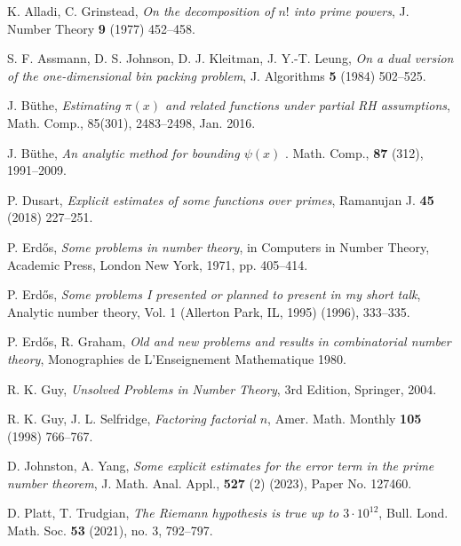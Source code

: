 \documentclass[12pt,a4paper,reqno]{amsart}
\numberwithin{equation}{section}
\theoremstyle{plain}
\theoremstyle{definition}
\begin{document}
\begin{thebibliography}{10}

  
K. Alladi, C. Grinstead, \emph{On the decomposition of $n!$ into prime powers}, J. Number Theory \textbf{9} (1977) 452--458.

S. F. Assmann, D. S. Johnson, D. J. Kleitman, J. Y.-T. Leung, \emph{On a dual version of the one-dimensional bin packing problem}, J. Algorithms \textbf{5} (1984) 502--525.

J. B\"uthe, \emph{Estimating $\pi(x)$ and related functions under partial RH assumptions}, Math. Comp., 85(301), 2483--2498, Jan. 2016.

J. B\"uthe, \emph{An analytic method for bounding $\psi(x)$
}. Math. Comp., \textbf{87} (312), 1991--2009.




P. Dusart, \emph{Explicit estimates of some functions over primes}, Ramanujan J. \textbf{45} (2018) 227--251.

P. Erd\H{o}s, \emph{Some problems in number theory}, in Computers in Number Theory, Academic Press, London New York, 1971, pp. 405--414.

P. Erd\H{o}s, \emph{Some problems I presented or planned to present in my short talk}, Analytic number theory, Vol. 1 (Allerton Park, IL, 1995) (1996), 333--335.

P. Erd\H{o}s, R. Graham, \emph{Old and new problems and results in combinatorial number theory}, Monographies de L'Enseignement Mathematique 1980.

R. K. Guy, \emph{Unsolved Problems in Number Theory}, 3rd Edition, Springer, 2004.

R. K. Guy, J. L. Selfridge, \emph{Factoring factorial $n$}, Amer. Math. Monthly \textbf{105} (1998) 766--767.

D. Johnston, A. Yang, \emph{Some explicit estimates for the error term in the prime number theorem}, J. Math. Anal. Appl., \textbf{527} (2) (2023), Paper No. 127460.

D. Platt, T. Trudgian, \emph{The Riemann hypothesis is true up to $3\cdot10^{12}$}, Bull. Lond. Math. Soc. \textbf{53} (2021), no. 3, 792--797.


\end{thebibliography}
\end{document}
